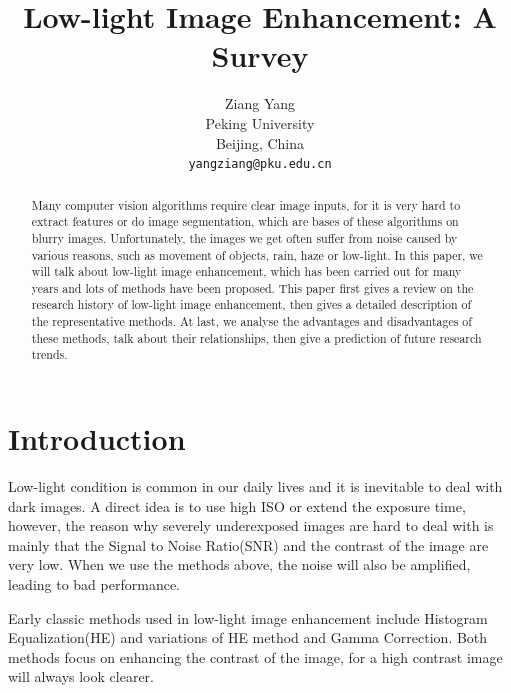 \documentclass[10pt,twocolumn,letterpaper]{article}
\begin{document}
\title{Low-light Image Enhancement: A Survey}

\author{Ziang Yang\\
Peking University\\
Beijing, China\\
{\tt\small yangziang@pku.edu.cn}

}

\maketitle

\begin{abstract}
   Many computer vision algorithms require clear image inputs, for it is very hard to extract features or do image segmentation, which are bases of these algorithms on blurry images. Unfortunately, the images we get often suffer from noise caused by various reasons, such as movement of objects, rain, haze or low-light. In this paper, we will talk about low-light image enhancement, which has been carried out for many years and lots of methods have been proposed. This paper first gives a review on the research history of low-light image enhancement, then gives a detailed description of the representative methods. At last, we analyse the advantages and disadvantages of these methods, talk about their relationships, then give a prediction of future research trends.
\end{abstract}

\section{Introduction}

Low-light condition is common in our daily lives and it is inevitable to deal with dark images. A direct idea is to use high ISO or extend the exposure time, however, the reason why severely underexposed images are hard to deal with is mainly that the Signal to Noise Ratio(SNR) and the contrast of the image are very low. When we use the methods above, the noise will also be amplified, leading to bad performance. 

Early classic methods used in low-light image enhancement include Histogram Equalization(HE) and variations of HE method \cite{pizer1987adaptive,kim1997contrast} and Gamma Correction\cite{Huang2013Efficient}. Both methods focus on enhancing the
contrast of the image, for a high contrast image will always look clearer.
\end{document}
